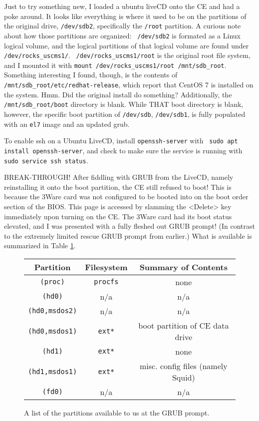 \documentclass[12pt]{article}
\begin{document}
\qq Just to try something new, I loaded a ubuntu liveCD onto the CE and had a
poke around. It looks like everything is where it used to be on the partitions
of the original drive, {\tt /dev/sdb2}, specifically the {\tt /root}
partition. A curious note about how those partitions are organized: {\tt
  /dev/sdb2} is formated as a Linux logical volume, and the logical partitions
of that logical volume are found under {\tt /dev/rocks\_uscms1/}. {\tt
  /dev/rocks\_uscms1/root} is the original root file system, and I mounted it
with {\tt mount /dev/rocks\_uscms1/root /mnt/sdb\_root}. Something interesting I
found, though, is the contents of {\tt /mnt/sdb\_root/etc/redhat-release}, which
report that CentOS 7 is installed on the system. Hmm. Did the original install
do something? Additionally, the {\tt /mnt/sdb\_root/boot} directory is
blank. While THAT boot directory is blank, however, the specific boot partition
of {\tt /dev/sdb}, {\tt /dev/sdb1}, is fully populated with an {\tt el7} image
and an updated grub. 

\qq To enable ssh on a Ubuntu LiveCD, install {\tt openssh-server} with {\tt
  sudo apt install openssh-server}, and check to make sure the service is running
with {\tt sudo service ssh status}.

\qq BREAK-THROUGH! After fiddling with GRUB from the LiveCD, namely reinstalling
it onto the boot partition, the CE still refused to boot! This is because the
3Ware card was not configured to be booted into on the boot order section of the
BIOS. This page is accessed by slamming the <Delete> key immediately upon
turning on the CE. The 3Ware card had its boot status elevated, and I was
presented with a fully fleshed out GRUB prompt! (In contrast to the extremely
limited rescue GRUB prompt from earlier.) What is available is summarized in
Table \ref{tab:grubPartitions}.

\begin{figure}[H]
  \label{tab:grubPartitions}
  \caption{A list of the partitions available to us at the GRUB prompt.}
  \begin{center}
    \begin{tabular}{|c|c|c|}
      \hline
      Partition & Filesystem & Summary of Contents \\
      \hline
      {\tt (proc)} & {\tt procfs} & none \\
      {\tt (hd0)} & n/a & n/a \\
      {\tt (hd0,msdos2)} & n/a & n/a \\
      {\tt (hd0,msdos1)} & {\tt ext*} & boot partition of CE data drive \\
      {\tt (hd1)} & {\tt ext*} & none \\
      {\tt (hd1,msdos1)} & {\tt ext*} & misc. config files (namely Squid) \\
      {\tt (fd0)} & n/a & n/a \\
      \hline
    \end{tabular}
  \end{center}
\end{figure}
\end{document}
